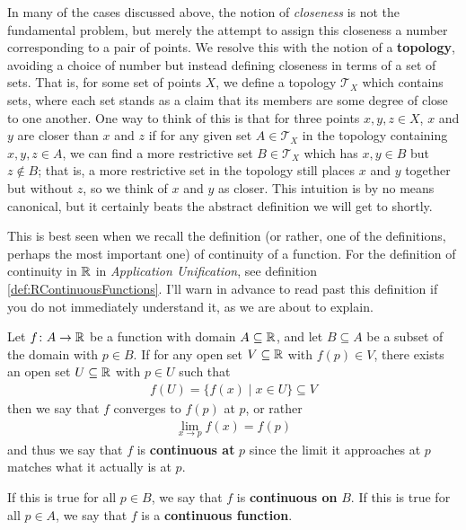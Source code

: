 \documentclass[11pt]{article}
\begin{document}
In many of the cases discussed above, the notion of \emph{closeness} is not the fundamental problem, but merely the attempt to assign this closeness a number corresponding to a pair of points. We resolve this with the notion of a \textbf{topology}, avoiding a choice of number but instead defining closeness in terms of a set of sets. That is, for some set of points $X$, we define a topology $\mathcal{T}_X$ which contains sets, where each set stands as a claim that its members are some degree of close to one another. One way to think of this is that for three points $x,y,z \in X$, $x$ and $y$ are closer than $x$ and $z$ if for any given set $A \in \mathcal{T}_X$ in the topology containing $x,y,z \in A$, we can find a more restrictive set $B \in \mathcal{T}_X$ which has $x,y \in B$ but $z \notin B$; that is, a more restrictive set in the topology still places $x$ and $y$ together but without $z$, so we think of $x$ and $y$ as closer. This intuition is by no means canonical, but it certainly beats the abstract definition we will get to shortly.


This is best seen when we recall the definition (or rather, one of the definitions, perhaps the most important one) of continuity of a function. For the definition of continuity in $\mathbb{R}$ in \emph{Application Unification}, see definition \ref{def:RContinuousFunctions}. I'll warn in advance to read past this definition if you do not immediately understand it, as we are about to explain.

\begin{definition}[Continuity]
Let $f\colon A \to \mathbb{R}$ be a function with domain $A \subseteq \mathbb{R}$, and let $B \subseteq A$ be a subset of the domain with $p \in B$. If for any open set $V \subseteq \mathbb{R}$ with $f(p) \in V$, there exists an open set $U \subseteq \mathbb{R}$ with $p\in U$ such that \begin{gather*}
f(U) = \{f(x) \mid x \in U\} \subseteq V
\end{gather*}
then we say that $f$ converges to $f(p)$ at $p$, or rather\begin{gather*}
\lim_{x \to p} f(x) = f(p)
\end{gather*}
and thus we say that $f$ is \textbf{continuous at} $p$ since the limit it approaches at $p$ matches what it actually is at $p$.

If this is true for all $p \in B$, we say that $f$ is \textbf{continuous on} $B$. If this is true for all $p\in A$, we say that $f$ is a \textbf{continuous function}.
\end{definition}
\end{document}
